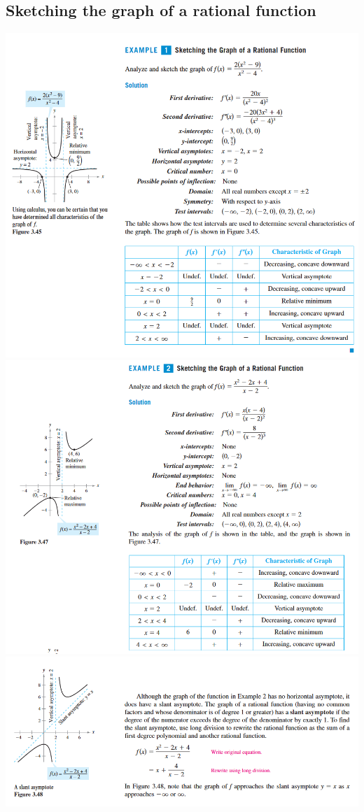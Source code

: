 \documentclass[11pt]{article}
\begin{document}
\subsection{Sketching the graph of a rational function}
\includegraphics{2.png} \newpage
\includegraphics{3.png} \newpage
\includegraphics{4.png}
\end{document}
